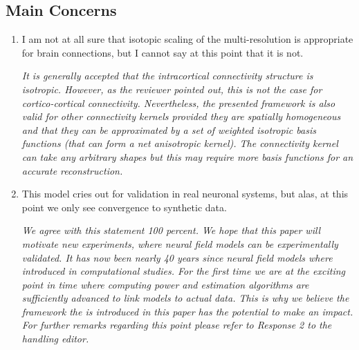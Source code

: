 \documentclass{article}
\newcommand{\parham}[1]{\textcolor{blue}{#1}}
\begin{document}
    \subsection{Main Concerns}
		\begin{enumerate} 
			\item I am not at all sure that isotopic scaling of the multi-resolution is appropriate for brain connections, but I cannot say at this point that it is not.
			
			\emph{It is generally accepted that the intracortical connectivity structure is isotropic. However, as the reviewer pointed out, this is not the case for cortico-cortical connectivity. Nevertheless, the presented framework is also valid for other connectivity kernels provided they are spatially homogeneous and that they can be approximated by a set of weighted isotropic basis functions (that can form a net anisotropic kernel). The connectivity kernel can take any arbitrary shapes but this may require more basis functions for an accurate reconstruction.}
			 
			\item This model cries out for validation in real neuronal systems, but alas, at this point we only see convergence to synthetic data.   
			  
			 \emph{We agree with this statement 100 percent. We hope that this paper will motivate new experiments, where neural field models can be experimentally validated. It has now been nearly 40 years since neural field models where introduced in computational studies. For the first time we are at the exciting point in time where computing power and estimation algorithms are sufficiently advanced to link models to actual data. This is why we believe the framework the is introduced in this paper has the potential to make an impact. For further remarks regarding this point please refer to Response 2 to the handling editor.}
			

\end{enumerate}
\end{document}
